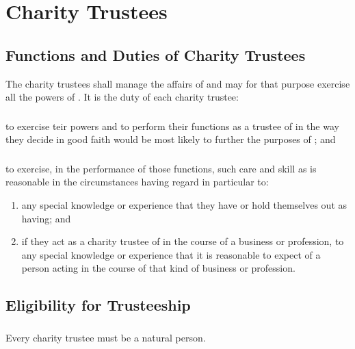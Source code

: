 \section{Charity Trustees}
\label{sec:trustees}

    \subsection{Functions and Duties of Charity Trustees}\label{sec:trustee_duties}
    The charity trustees shall manage the affairs of \shortname{} and may for that purpose exercise all the powers of \shortname{}. It is the duty of each charity trustee:

        \subsubsection{}
        to exercise teir powers and to perform their functions as a trustee of \shortname{} in the way they decide in good faith would be most likely to further the purposes of \shortname{}; and

        \subsubsection{}
        to exercise, in the performance of those functions, such care and skill as is reasonable in the circumstances having regard in particular to:
        \begin{enumerate}
            \item any special knowledge or experience that they have or hold themselves out as having; and
            \item if they act as a charity trustee of \shortname{} in the course of a business or profession, to any special knowledge or experience that it is reasonable to expect of a person acting in the course of that kind of business or profession.
        \end{enumerate}

    \subsection{Eligibility for Trusteeship}\label{sec:trustee_eligibility}

        \subsubsection{}
        Every charity trustee must be a natural person.

